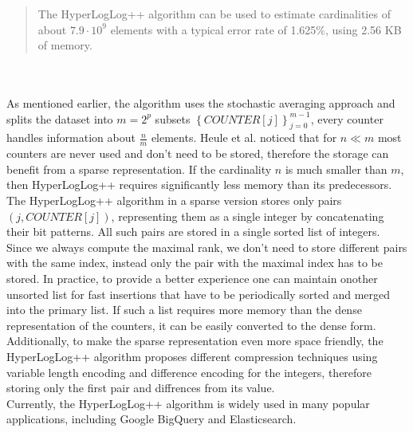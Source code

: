 \documentclass[a4paper,13pt]{article}
\theoremstyle{mytheor}
\begin{document}
\begin{quote}
    The HyperLogLog++ algorithm can be used to estimate cardinalities of\\
    about $7.9\cdot10^9$ elements with a typical error rate of 1.625\%, using
    2.56 KB\\ of memory.
    \vspace{0.25cm}
\end{quote}
\\\\
\indent As mentioned earlier, the algorithm uses the stochastic averaging
approach and splits the dataset into $m = 2^p$ subsets $\left\{COUNTER[j]\right\}_{j=0}^{m-1}$, every counter handles
information about $\frac{n}{m}$ elements. Heule et al. noticed that for $n \ll m$
most counters are never used and don't need to be stored, therefore
the storage can benefit from a sparse representation. If the cardinality
$n$ is much smaller than $m$, then HyperLogLog++ requires significantly
less memory than its predecessors.\\
\indent The HyperLogLog++ algorithm in a sparse version stores only pairs
$(j, COUNTER[j])$, representing them as a single integer by concatenating
their bit patterns. All such pairs are stored in a single sorted list of
integers. Since we always compute the maximal rank, we don't need
to store different pairs with the same index, instead only the pair with
the maximal index has to be stored. In practice, to provide a better
experience one can maintain onother unsorted list for fast insertions that
have to be periodically sorted and merged into the primary list. If such
a list requires more memory than the dense representation of the counters,
it can be easily converted to the dense form. Additionally, to make
the sparse representation even more space friendly, the HyperLogLog++
algorithm proposes different compression techniques using variable length
encoding and difference encoding for the integers, therefore storing only
the first pair and diffrences from its value.\\
\indent Currently, the HyperLogLog++ algorithm is widely used in many
popular applications, including Google BigQuery and Elasticsearch.
\end{document}
